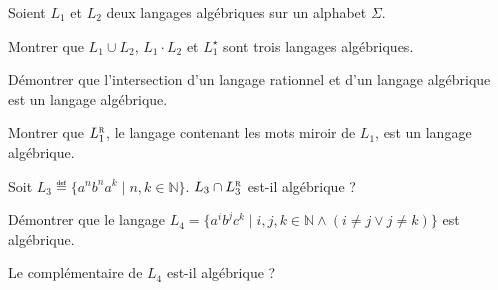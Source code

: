 
\begingroup

\begin{exercice}\label{exo:parsing/decidability/challenge}

  Soient $L_1$ et $L_2$ deux langages algébriques sur un alphabet $\Sigma$.
  \begin{questions}
  \item Montrer que $ L_1 \cup L_2 $, $ L_1 \cdot L_2 $ et $ L_1^\star $ sont trois langages algébriques.
  \item Démontrer que l'intersection d'un langage rationnel et d'un langage algébrique est un langage algébrique. 
  \item Montrer que $ L_1^{\textsc{r}} $, le langage contenant les mots miroir de $L_1$, est un langage algébrique. 
  \item Soit $L_3 \eqdef \{a^n b^n a^k \mid n, k \in \mathbb{N}\}$. $L_3 \cap L_3^{\textsc{r}}$ est-il algébrique ?
  \item Démontrer que le langage $L_4 = \{ a^i b^j c^k \mid i, j, k \in \mathbb{N} \land (i \neq j \lor j \neq k) \}$ est algébrique.
  \item Le complémentaire de $L_4$ est-il algébrique ?
  \end{questions}

\end{exercice}


